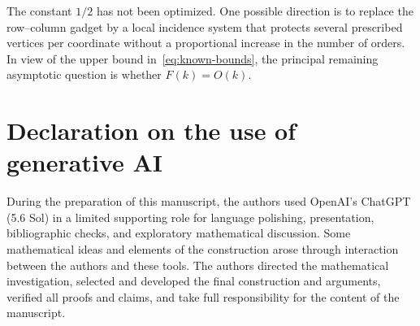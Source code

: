\documentclass[12pt]{article}
\theoremstyle{remark}
\begin{document}
The constant $1/2$ has not been optimized.  One possible direction is
to replace the row--column gadget by a local incidence system that
protects several prescribed vertices per coordinate without a
proportional increase in the number of orders.  In view of the upper
bound in~\eqref{eq:known-bounds}, the principal remaining asymptotic
question is whether $F(k)=O(k)$.

\section*{Declaration on the use of generative AI}

During the preparation of this manuscript, the authors used OpenAI's
ChatGPT (5.6 Sol) in a limited supporting role for language polishing, presentation, bibliographic checks, and exploratory mathematical discussion.  Some mathematical ideas and elements of the construction
arose through interaction between the authors and these tools.  The authors directed the mathematical investigation, selected and developed the final construction and arguments, verified all proofs and claims, and take full responsibility for the content of the manuscript.
\end{document}
